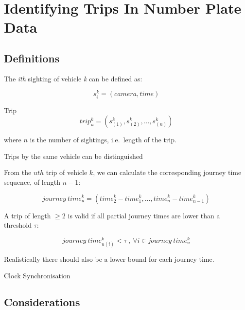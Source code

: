 \section{Identifying Trips In Number Plate Data}



\subsection{Definitions}

The \emph{ith} sighting of vehicle \emph{k} can be defined as:

\begin{equation} \label{e2.1.1}
s^{k}_{i} = \left(camera, time\right)
\end{equation}

Trip
\begin{equation} \label{e2.1.2}
trip^{k}_{u} = \left(s^{k}_{(1)}, s^{k}_{(2)}, \dots , s^{k}_{(n)}\right)
\end{equation}

where \( n \) is the number of sightings, i.e.\ length of the trip.

Trips by the same vehicle can be distinguished

From the \( uth \) trip of vehicle \( k \), we can calculate the corresponding journey time sequence, of length \(n-1\):

\begin{equation} \label{e2.1.3}
journey\ time^{k}_{u} = \left(time^{k}_{2} - time^{k}_{1}, \ldots, time^{k}_{n} - time^{k}_{n-1} \right)
\end{equation}

A trip of length \( \ge 2 \) is valid if all partial journey times are lower than a threshold \( \tau \):

\begin{equation} \label{e2.1.4}
journey\ time^{k}_{u(i)} < \tau \ , \ \forall i \in journey\ time^{k}_{u}
\end{equation}

Realistically there should also be a lower bound for each journey time.

Clock Synchronisation

\subsection{Considerations}



